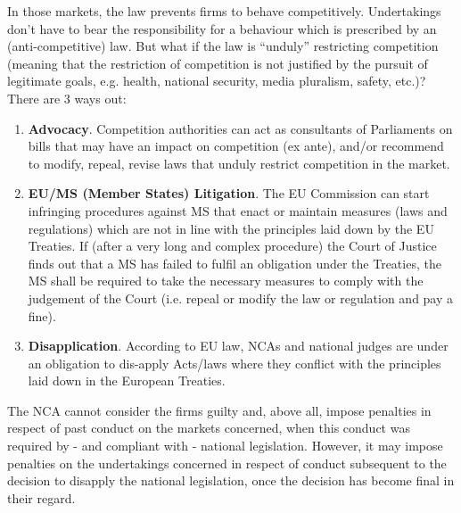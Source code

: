             In those markets, the law prevents firms to behave competitively. Undertakings don’t have to bear the responsibility for a behaviour which is prescribed by an (anti-competitive) law.  But what if the law is “unduly” restricting competition (meaning that the restriction of competition is not justified by the pursuit of legitimate goals, e.g. health, national security, media pluralism, safety, etc.)? There are 3 ways out:
                \begin{enumerate}
                    \item \textbf{Advocacy}. Competition authorities can act as consultants of Parliaments on bills that may have an impact on competition (ex ante), and/or recommend to modify, repeal, revise laws that unduly restrict competition in the market.
                    \item \textbf{EU/MS (Member States) Litigation}. The EU Commission can start infringing procedures against MS that enact or maintain measures (laws and regulations) which are not in line with the principles laid down by the EU Treaties. If (after a very long and complex procedure) the Court of Justice finds out that a MS has failed to fulfil an obligation under the Treaties, the MS shall be required to take the necessary measures to comply with the judgement of the Court (i.e. repeal or modify the law or regulation and pay a fine).
                    \item \textbf{Disapplication}. According to EU law, NCAs and national judges are under an obligation to dis-apply Acts/laws where they conflict with the principles laid down in the European Treaties.
                \end{enumerate}


            The NCA cannot consider the firms guilty and, above all, impose penalties in respect of past conduct on the markets concerned, when this conduct was required by - and compliant with - national legislation. However, it may impose penalties on the undertakings concerned in respect of conduct subsequent to the decision to disapply the national legislation, once the decision has become final in their regard.

